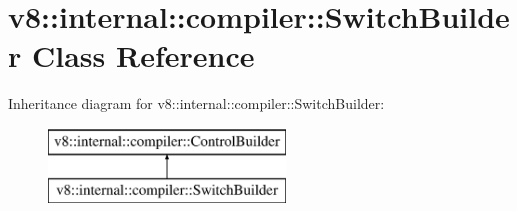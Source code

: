 \hypertarget{classv8_1_1internal_1_1compiler_1_1_switch_builder}{}\section{v8\+:\+:internal\+:\+:compiler\+:\+:Switch\+Builder Class Reference}
\label{classv8_1_1internal_1_1compiler_1_1_switch_builder}
Inheritance diagram for v8\+:\+:internal\+:\+:compiler\+:\+:Switch\+Builder\+:\begin{figure}[H]
\begin{center}
\leavevmode
\includegraphics[height=2.000000cm]{classv8_1_1internal_1_1compiler_1_1_switch_builder}
\end{center}
\end{figure}
